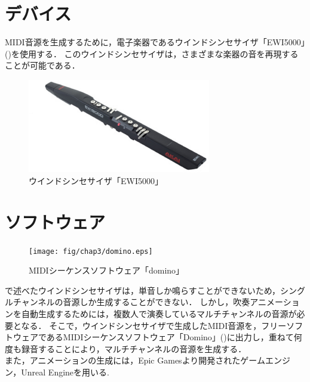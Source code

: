 \section{デバイス} \label{sec:device}
MIDI音源を生成するために，電子楽器であるウインドシンセサイザ「EWI5000」()を使用する．
このウインドシンセサイザは，さまざまな楽器の音を再現することが可能である．
\begin{figure}[h]
	\centering
	\includegraphics[width=8cm]{fig/chap3/ewi.eps}
	\caption{ウインドシンセサイザ「EWI5000」}
	\label{fig:ewi}
\end{figure}

\section{ソフトウェア} \label{sec:software}
\begin{figure}[h]
	\centering
	\texttt{[image: fig/chap3/domino.eps]}
	\caption{MIDIシーケンスソフトウェア「domino」}
	\label{fig:domino}
\end{figure}
で述べたウインドシンセサイザは，単音しか鳴らすことができないため，シングルチャンネルの音源しか生成することができない．
しかし，吹奏アニメーションを自動生成するためには，複数人で演奏しているマルチチャンネルの音源が必要となる．
そこで，ウインドシンセサイザで生成したMIDI音源を，フリーソフトウェアであるMIDIシーケンスソフトウェア「Domino」()\cite{domino}に出力し，重ねて何度も録音することにより，マルチチャンネルの音源を生成する．\\
\indent
また，アニメーションの生成には，Epic Gamesより開発されたゲームエンジン，Unreal Engine\cite{ue4}を用いる.

